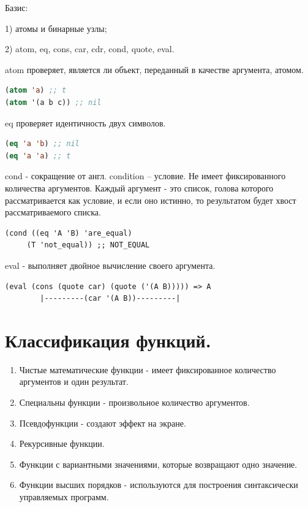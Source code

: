 Базис:

1) атомы и бинарные узлы;

2) atom, eq, cons, car, cdr, cond, quote, eval.

atom проверяет, является ли объект, переданный в качестве аргумента, атомом.

\begin{lstlisting}[language=Lisp]
(atom 'a) ;; t
(atom '(a b c)) ;; nil
\end{lstlisting}

eq проверяет идентичность двух символов.
\begin{lstlisting}[language=Lisp]
(eq 'a 'b) ;; nil
(eq 'a 'a) ;; t
\end{lstlisting}
	
cond - сокращение от англ. condition – условие. 
Не имеет фиксированного количества аргументов.
Каждый аргумент - это список, голова которого рассматривается как условие, 
и если оно истинно, то результатом будет хвост рассматриваемого списка.

\begin{lstlisting}
(cond ((eq 'A 'B) 'are_equal)
	 (T 'not_equal)) ;; NOT_EQUAL
\end{lstlisting}

eval - выполняет двойное вычисление своего аргумента.

\begin{lstlisting}
(eval (cons (quote car) (quote ('(A B))))) => A
		|---------(car '(A B))---------|

\end{lstlisting}

\section{Классификация функций.}

\begin{enumerate}
	\item Чистые математические функции - имеет фиксированное количество аргументов и один результат.
	\item Специальны функции - произвольное количество аргументов.
	\item Псевдофункции - создают эффект на экране.
	\item Рекурсивные функции.
	\item Функции с вариантными значениями, которые возвращают одно значение.
	\item Функции высших порядков - используются для построения синтаксически управляемых программ. %
\end{enumerate}

